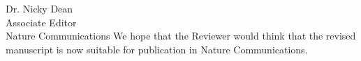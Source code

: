 \documentclass[a4paper, rebuttal, parskip=true, firsthead=false, fromemail=true, foldmarks=false]{scrlttr2}
\begin{document}
\begin{letter}{Dr. Nicky Dean\\
Associate Editor\\
Nature Communications}
We hope that the Reviewer would think that the revised manuscript is now suitable for publication in Nature Communications. 


\end{letter} 
\end{document}
